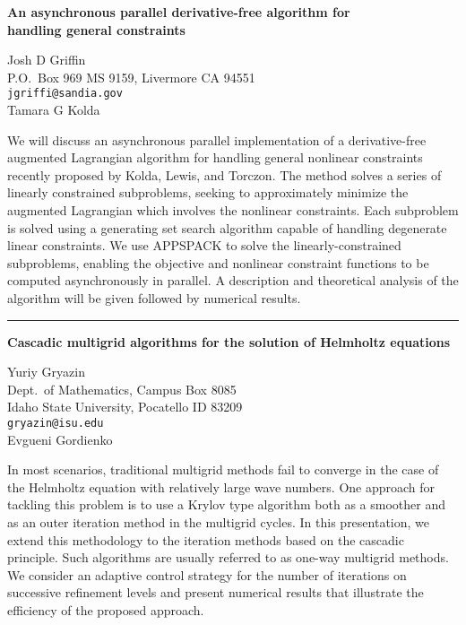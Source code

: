 \documentclass[twosided]{report}
\begin{document}
\begin{center}
{\large			%
{\bf An asynchronous parallel derivative-free algorithm for \\
	handling general constraints}}

	Josh D Griffin \\
	P.O.~Box 969 MS 9159,  Livermore CA 94551 \\
	{\tt jgriffi@sandia.gov} \\
	Tamara G Kolda
\end{center}
We will discuss an asynchronous parallel implementation of a
derivative-free augmented Lagrangian algorithm for handling
general nonlinear constraints recently proposed by Kolda,
Lewis, and Torczon. The method solves a series of linearly
constrained subproblems, seeking to approximately minimize
the augmented Lagrangian which involves the nonlinear
constraints. Each subproblem is solved using a generating
set search algorithm capable of handling degenerate linear
constraints. We use APPSPACK to solve the
linearly-constrained subproblems, enabling the objective and
nonlinear constraint functions to be computed asynchronously
in parallel. A description and theoretical analysis of the
algorithm will be given followed by numerical results.



	\begin{center} \rule{6in}{1pt} \end{center}

\begin{center}
{\large			%
{\bf Cascadic multigrid algorithms for the solution of Helmholtz equations}}

	Yuriy Gryazin \\
	Dept.~of Mathematics, Campus Box 8085 \\
	Idaho State University, Pocatello ID 83209 \\
	{\tt gryazin@isu.edu} \\
	Evgueni Gordienko
\end{center}
In most scenarios, traditional multigrid methods fail to
converge in the case of the Helmholtz equation with
relatively large wave numbers. One approach for tackling
this problem is to use a Krylov type algorithm both as a
smoother and as an outer iteration method in the multigrid
cycles. In this presentation, we extend this methodology to
the iteration methods based on the cascadic principle. Such
algorithms are usually referred to as one-way multigrid
methods. We consider an adaptive control strategy for the
number of iterations on successive refinement levels and
present numerical results that illustrate the efficiency of
the proposed approach.
\end{document}
